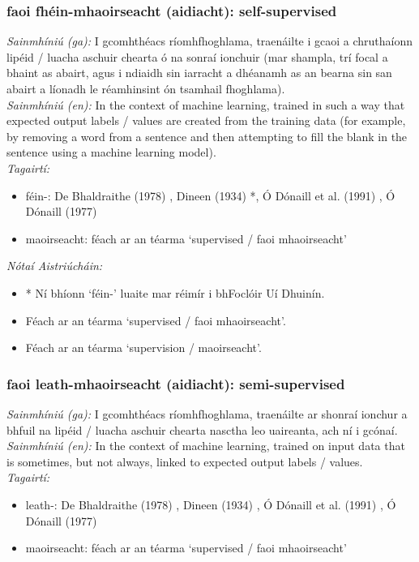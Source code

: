 \subsubsection*{faoi fhéin-mhaoirseacht (aidiacht): self-supervised}
 \noindent \textit{Sainmhíniú (ga):} I gcomhthéacs ríomhfhoghlama, traenáilte i gcaoi a chruthaíonn lipéid / luacha aschuir chearta ó na sonraí ionchuir (mar shampla, trí focal a bhaint as abairt, agus i ndiaidh sin iarracht a dhéanamh as an bearna sin san abairt a líonadh le réamhinsint ón tsamhail fhoghlama).
\\
 \noindent \textit{Sainmhíniú (en):} In the context of machine learning, trained in such a way that expected output labels / values are created from the training data (for example, by removing a word from a sentence and then attempting to fill the blank in the sentence using a machine learning model).
\\
 \noindent \textit{Tagairtí:}
\begin{itemize}
	\item féin-: De Bhaldraithe (1978) \cite{de-bhaldraithe}, Dineen (1934) \cite{dineen}*, Ó Dónaill et al. (1991) \cite{focloir-beag}, Ó Dónaill (1977) \cite{odonaill}
	\item maoirseacht: féach ar an téarma `supervised / faoi mhaoirseacht'
\end{itemize}

 \noindent \textit{Nótaí Aistriúcháin:}
\begin{itemize}
	\item * Ní bhíonn `féin-' luaite mar réimír i bhFoclóir Uí Dhuinín.
	\item Féach ar an téarma `supervised / faoi mhaoirseacht'.
	\item Féach ar an téarma `supervision / maoirseacht'.
\end{itemize}


\subsubsection*{faoi leath-mhaoirseacht (aidiacht): semi-supervised}
 \noindent \textit{Sainmhíniú (ga):} I gcomhthéacs ríomhfhoghlama, traenáilte ar shonraí ionchur a bhfuil na lipéid / luacha aschuir chearta nasctha leo uaireanta, ach ní i gcónaí.
\\
 \noindent \textit{Sainmhíniú (en):} In the context of machine learning, trained on input data that is sometimes, but not always, linked to expected output labels / values.
\\
 \noindent \textit{Tagairtí:}
\begin{itemize}
	\item leath-: De Bhaldraithe (1978) \cite{de-bhaldraithe}, Dineen (1934) \cite{dineen}, Ó Dónaill et al. (1991) \cite{focloir-beag}, Ó Dónaill (1977) \cite{odonaill}
	\item maoirseacht: féach ar an téarma `supervised / faoi mhaoirseacht'
\end{itemize}

